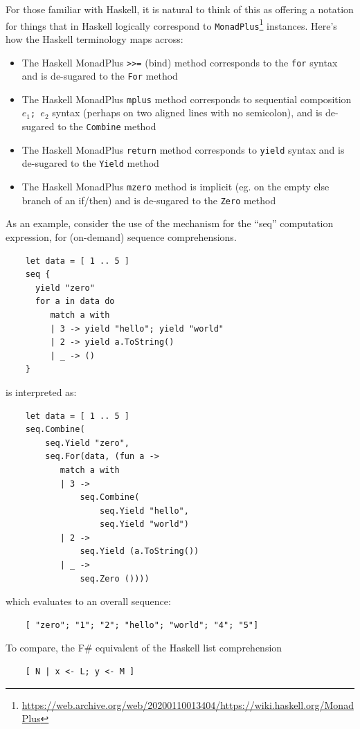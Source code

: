 \documentclass[acmsmall]{acmart}\settopmatter{}
\begin{document}
For those familiar with Haskell, it is natural to think of this as offering a notation for things that in Haskell logically
correspond to \texttt{MonadPlus}\footnote{\url{https://web.archive.org/web/20200110013404/https://wiki.haskell.org/MonadPlus}} instances.  Here’s how the Haskell terminology maps across:
\begin{itemize}
\item The Haskell MonadPlus \texttt{>>=} (bind) method corresponds to the \texttt{for} syntax and is de-sugared to the \texttt{For} method

\item The Haskell MonadPlus \texttt{mplus} method corresponds to sequential composition \texttt{$e_1$; $e_2$} syntax (perhaps on two aligned lines with no semicolon), and is de-sugared to the \texttt{Combine} method

\item The Haskell MonadPlus \texttt{return} method corresponds to \texttt{yield} syntax and is de-sugared to the \texttt{Yield} method

\item The Haskell MonadPlus \texttt{mzero} method is implicit (eg. on the empty else branch of an if/then) and is de-sugared to the \texttt{Zero} method
\end{itemize}
As an example, consider the use of the mechanism for the “seq” computation expression, for (on-demand) sequence comprehensions. 
\begin{verbatim}
    let data = [ 1 .. 5 ]
    seq {
      yield "zero"
      for a in data do
         match a with
         | 3 -> yield "hello"; yield "world"
         | 2 -> yield a.ToString() 
         | _ -> () 
    }
\end{verbatim}
is interpreted as:
\begin{verbatim}
    let data = [ 1 .. 5 ]
    seq.Combine(
        seq.Yield "zero",
        seq.For(data, (fun a ->
           match a with
           | 3 -> 
               seq.Combine(
                   seq.Yield "hello", 
                   seq.Yield "world")
           | 2 ->
               seq.Yield (a.ToString())
           | _ ->
               seq.Zero ())))
\end{verbatim}
which evaluates to an overall sequence:
\begin{verbatim}
    [ "zero"; "1"; "2"; "hello"; "world"; "4"; "5"] 
\end{verbatim}
To compare, the F\# equivalent of the Haskell list comprehension
\begin{verbatim}
    [ N | x <- L; y <- M ]  
\end{verbatim}
\end{document}

